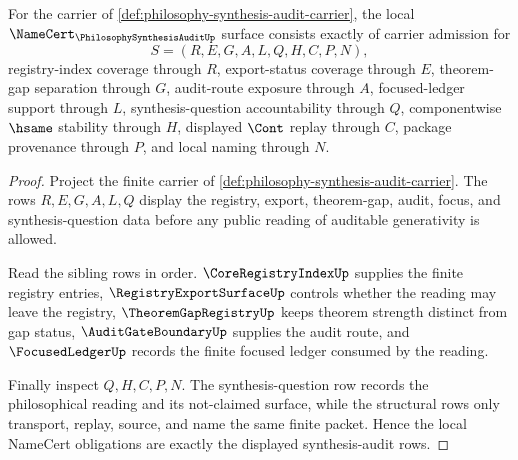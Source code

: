\begin{theorem}
\label{thm:philosophy-synthesis-audit-namecert-obligations}
For the carrier of \autoref{def:philosophy-synthesis-audit-carrier}, the local $\NameCert_{\PhilosophySynthesisAuditUp}$ surface consists exactly of carrier admission for
$$
S=(R,E,G,A,L,Q,H,C,P,N),
$$
registry-index coverage through $R$, export-status coverage through $E$, theorem-gap separation through $G$, audit-route exposure through $A$, focused-ledger support through $L$, synthesis-question accountability through $Q$, componentwise $\hsame$ stability through $H$, displayed $\Cont$ replay through $C$, package provenance through $P$, and local naming through $N$.
\end{theorem}
\begin{proof}
Project the finite carrier of \autoref{def:philosophy-synthesis-audit-carrier}. The rows $R,E,G,A,L,Q$ display the registry, export, theorem-gap, audit, focus, and synthesis-question data before any public reading of auditable generativity is allowed.

Read the sibling rows in order. $\CoreRegistryIndexUp$ supplies the finite registry entries, $\RegistryExportSurfaceUp$ controls whether the reading may leave the registry, $\TheoremGapRegistryUp$ keeps theorem strength distinct from gap status, $\AuditGateBoundaryUp$ supplies the audit route, and $\FocusedLedgerUp$ records the finite focused ledger consumed by the reading.

Finally inspect $Q,H,C,P,N$. The synthesis-question row records the philosophical reading and its not-claimed surface, while the structural rows only transport, replay, source, and name the same finite packet. Hence the local NameCert obligations are exactly the displayed synthesis-audit rows.
\end{proof}

